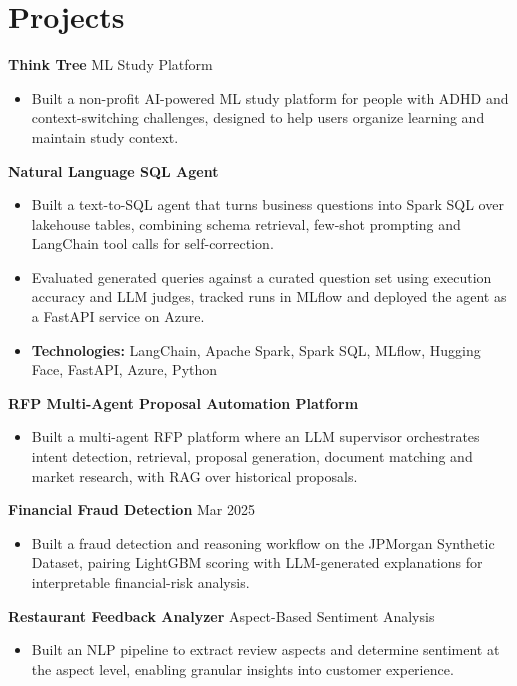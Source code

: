 \documentclass[10pt,a4paper]{article}
\begin{document}
\section{Projects}
\textbf{Think Tree} \textbar{} ML Study Platform\par
\begin{itemize}
  \item Built a non-profit AI-powered ML study platform for people with ADHD and context-switching challenges, designed to help users organize learning and maintain study context.
\end{itemize}
\textbf{Natural Language SQL Agent}\par
\begin{itemize}
  \item Built a text-to-SQL agent that turns business questions into Spark SQL over lakehouse tables, combining schema retrieval, few-shot prompting and LangChain tool calls for self-correction.
  \item Evaluated generated queries against a curated question set using execution accuracy and LLM judges, tracked runs in MLflow and deployed the agent as a FastAPI service on Azure.
  \item \textbf{Technologies:} LangChain, Apache Spark, Spark SQL, MLflow, Hugging Face, FastAPI, Azure, Python
\end{itemize}
\textbf{RFP Multi-Agent Proposal Automation Platform}\par
\begin{itemize}
  \item Built a multi-agent RFP platform where an LLM supervisor orchestrates intent detection, retrieval, proposal generation, document matching and market research, with RAG over historical proposals.
\end{itemize}
\textbf{Financial Fraud Detection} \textbar{} Mar 2025\par
\begin{itemize}
  \item Built a fraud detection and reasoning workflow on the JPMorgan Synthetic Dataset, pairing LightGBM scoring with LLM-generated explanations for interpretable financial-risk analysis.
\end{itemize}
\textbf{Restaurant Feedback Analyzer} \textbar{} Aspect-Based Sentiment Analysis\par
\begin{itemize}
  \item Built an NLP pipeline to extract review aspects and determine sentiment at the aspect level, enabling granular insights into customer experience.
\end{itemize}
\end{document}
